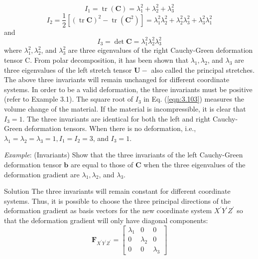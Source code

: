 \begin{equation}
 I_{1}=\operatorname{tr}(\mathbf{C})=\lambda_{1}^{2}+\lambda_{2}^{2}+\lambda_{3}^{2} 
     \label{eqn:3.101}
 \end{equation}
 \begin{equation}
 \label{eqn:3.102}
 I_{2}=\frac{1}{2}\left[(\operatorname{tr} \mathbf{C})^{2}-\operatorname{tr}\left(\mathbf{C}^{2}\right)\right]=\lambda_{1}^{2} \lambda_{2}^{2}+\lambda_{2}^{2} \lambda_{3}^{2}+\lambda_{3}^{2} \lambda_{1}^{2} 
\end{equation}
and
\begin{equation}
\label{eqn:3.103}
 I_{3}=\operatorname{det} \mathbf{C}=\lambda_{1}^{2} \lambda_{2}^{2} \lambda_{3}^{2} 
\end{equation}
where $ \lambda_{1}^{2}, \lambda_{2}^{2} $, and $ \lambda_{3}^{2} $ are three eigenvalues of the right Cauchy-Green deformation tensor C. From polar decomposition, it has been shown that $ \lambda_{1}, \lambda_{2} $, and $ \lambda_{3} $ are three eigenvalues of the left stretch tensor $ \mathbf{U}- $ also called the principal stretches. The above three invariants will remain unchanged for different coordinate systems. In order to be a valid deformation, the three invariants must be positive (refer to Example 3.1). The square root of $ I_{3} $ in Eq. (\ref{eqn:3.103}) measures the volume change of the material. If the material is incompressible, it is clear that $ I_{3}=1 $. The three invariants are identical for both the left and right Cauchy-Green deformation tensors. When there is no deformation, i.e., $ \lambda_{1}=\lambda_{2}=\lambda_{3}=1, I_{1}=I_{2}=3 $, and $ I_{3}=1 $.

\textit{Example}: (Invariants) Show that the three invariants of the left Cauchy-Green deformation tensor $ \mathbf{b} $ are equal to those of $ \mathbf{C} $ when the three eigenvalues of the deformation gradient are $ \lambda_{1}, \lambda_{2} $, and $ \lambda_{3} $.



Solution The three invariants will remain constant for different coordinate systems. Thus, it is possible to choose the three principal directions of the deformation gradient as basis vectors for the new coordinate system $ X^{\prime} Y^{\prime} Z^{\prime} $ so that the deformation gradient will only have diagonal components:
\begin{equation*}
 \mathbf{F}_{X^{\prime} Y^{\prime} Z^{\prime}}=\left[\begin{array}{ccc}\lambda_{1} & 0 & 0 \\ 0 & \lambda_{2} & 0 \\ 0 & 0 & \lambda_{3}\end{array}\right] 
\end{equation*}


